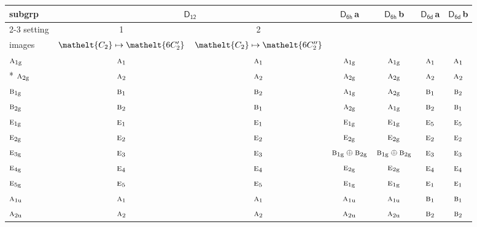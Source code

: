 \documentclass[10pt,a4paper]{article}
\numberwithin{equation}{section}
\newcommand{\eltfont}[1]{{\let\sigma\eltsigma\mathelt{#1}}}
\newcommand{\grp}[1]{\mathsf{#1}}
\newcommand{\irr}[1]{\text{\normalfont\scshape #1}}
\newcommand{\cls}[1]{\eltfont{#1}}
\newcommand{\ptag}[1]{\mathrm{#1}}
\newcommand{\clsletter}[1]{\,{\scriptsize\color{black!55}#1}}
\begin{document}
{\small\begin{longtable}{@{}lcccccc@{}}\toprule
subgrp & \multicolumn{2}{c}{\href{D12.pdf}{$\grp{D_{12}}$}} & \href{D6h.pdf}{$\grp{D_{6h}}$}\clsletter{a} & \href{D6h.pdf}{$\grp{D_{6h}}$}\clsletter{b} & \href{D6d.pdf}{$\grp{D_{6d}}$}\clsletter{a} & \href{D6d.pdf}{$\grp{D_{6d}}$}\clsletter{b}\\\cmidrule(lr){2-3}
setting & 1 & 2 &  &  &  & \\
images & {\scriptsize $\cls{C_{2}} \mapsto \cls{6C_{2}'}$} & {\scriptsize $\cls{C_{2}} \mapsto \cls{6C_{2}''}$} &  &  &  & \\\midrule\endhead
\bottomrule\endfoot\endlastfoot
$\irr{a}_{1\ptag{g}}$ & $\irr{a}_{1}$ & $\irr{a}_{1}$ & $\irr{a}_{1\ptag{g}}$ & $\irr{a}_{1\ptag{g}}$ & $\irr{a}_{1}$ & $\irr{a}_{1}$\\*
$\irr{a}_{2\ptag{g}}$ & $\irr{a}_{2}$ & $\irr{a}_{2}$ & $\irr{a}_{2\ptag{g}}$ & $\irr{a}_{2\ptag{g}}$ & $\irr{a}_{2}$ & $\irr{a}_{2}$\\
$\irr{b}_{1\ptag{g}}$ & $\irr{b}_{1}$ & $\irr{b}_{2}$ & $\irr{a}_{1\ptag{g}}$ & $\irr{a}_{2\ptag{g}}$ & $\irr{b}_{1}$ & $\irr{b}_{2}$\\
$\irr{b}_{2\ptag{g}}$ & $\irr{b}_{2}$ & $\irr{b}_{1}$ & $\irr{a}_{2\ptag{g}}$ & $\irr{a}_{1\ptag{g}}$ & $\irr{b}_{2}$ & $\irr{b}_{1}$\\
$\irr{e}_{1\ptag{g}}$ & $\irr{e}_{1}$ & $\irr{e}_{1}$ & $\irr{e}_{1\ptag{g}}$ & $\irr{e}_{1\ptag{g}}$ & $\irr{e}_{5}$ & $\irr{e}_{5}$\\
$\irr{e}_{2\ptag{g}}$ & $\irr{e}_{2}$ & $\irr{e}_{2}$ & $\irr{e}_{2\ptag{g}}$ & $\irr{e}_{2\ptag{g}}$ & $\irr{e}_{2}$ & $\irr{e}_{2}$\\
$\irr{e}_{3\ptag{g}}$ & $\irr{e}_{3}$ & $\irr{e}_{3}$ & $\irr{b}_{1\ptag{g}}\oplus \irr{b}_{2\ptag{g}}$ & $\irr{b}_{1\ptag{g}}\oplus \irr{b}_{2\ptag{g}}$ & $\irr{e}_{3}$ & $\irr{e}_{3}$\\
$\irr{e}_{4\ptag{g}}$ & $\irr{e}_{4}$ & $\irr{e}_{4}$ & $\irr{e}_{2\ptag{g}}$ & $\irr{e}_{2\ptag{g}}$ & $\irr{e}_{4}$ & $\irr{e}_{4}$\\
$\irr{e}_{5\ptag{g}}$ & $\irr{e}_{5}$ & $\irr{e}_{5}$ & $\irr{e}_{1\ptag{g}}$ & $\irr{e}_{1\ptag{g}}$ & $\irr{e}_{1}$ & $\irr{e}_{1}$\\
$\irr{a}_{1\ptag{u}}$ & $\irr{a}_{1}$ & $\irr{a}_{1}$ & $\irr{a}_{1\ptag{u}}$ & $\irr{a}_{1\ptag{u}}$ & $\irr{b}_{1}$ & $\irr{b}_{1}$\\
$\irr{a}_{2\ptag{u}}$ & $\irr{a}_{2}$ & $\irr{a}_{2}$ & $\irr{a}_{2\ptag{u}}$ & $\irr{a}_{2\ptag{u}}$ & $\irr{b}_{2}$ & $\irr{b}_{2}$\\

\end{longtable}}
\end{document}
